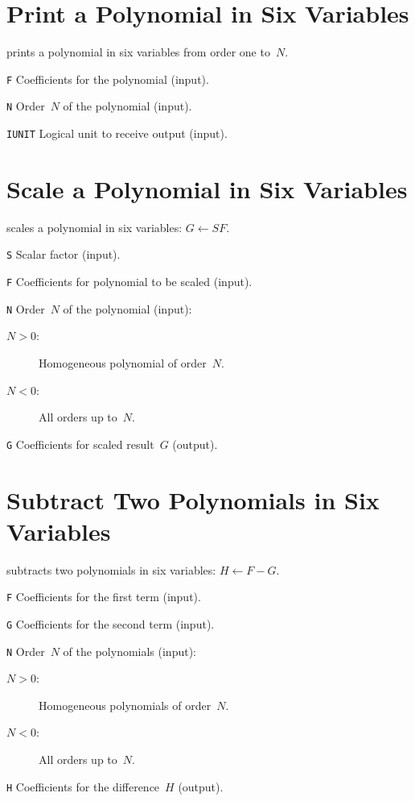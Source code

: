 \section{Print a Polynomial in Six Variables}
\label{PA6PRT}
prints a polynomial in six variables from order one to~$N$.
\begin{mylist}
\item[\tt F]
Coefficients for the polynomial (input).   
\item[\tt N]
Order~$N$ of the polynomial (input).
\item[\tt IUNIT]
Logical unit to receive output (input).
\end{mylist}

\section{Scale a Polynomial in Six Variables}
\label{PA6SCL}
scales a polynomial in six variables: $G \leftarrow S F$.
\begin{mylist}
\item[\tt S]
Scalar factor (input).
\item[\tt F]
Coefficients for polynomial to be scaled (input).   
\item[\tt N]
Order~$N$ of the polynomial (input):
\begin{description}
\item[$N > 0$:] Homogeneous polynomial of order~$N$.
\item[$N < 0$:] All orders up to~$N$.
\end{description}
\item[\tt G]
Coefficients for scaled result~$G$ (output).
\end{mylist}

\section{Subtract Two Polynomials in Six Variables}
\label{PA6SUB}
subtracts two polynomials in six variables: $H \leftarrow F - G$.
\begin{mylist}
\item[\tt F]
Coefficients for the first term (input).   
\item[\tt G]
Coefficients for the second term (input).
\item[\tt N]
Order~$N$ of the polynomials (input):
\begin{description}
\item[$N > 0$:] Homogeneous polynomials of order~$N$.
\item[$N < 0$:] All orders up to~$N$.
\end{description}
\item[\tt H]
Coefficients for the difference~$H$ (output).
\end{mylist}

